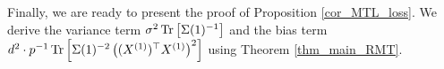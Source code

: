 Finally, we are ready to present the proof of Proposition \ref{cor_MTL_loss}.
We derive the variance term $\sigma^2  \operatorname{Tr}\left[\Sigma(1)^{-1}  \right]$ and the bias term $d^2\cdot {p}^{-1}\operatorname{Tr}\left[\Sigma(1)^{-2} \left((X^{(1)})^\top X^{(1)} \right)^2\right]$ using Theorem \ref{thm_main_RMT}.

